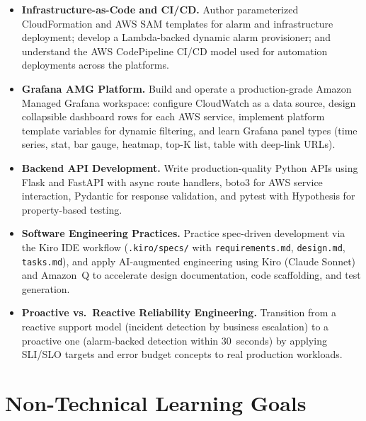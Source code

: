 \begin{itemize}
    \item \textbf{Infrastructure-as-Code and CI/CD.}
          Author parameterized CloudFormation and AWS SAM templates for
          alarm and infrastructure deployment; develop a Lambda-backed
          dynamic alarm provisioner; and understand the AWS CodePipeline
          CI/CD model used for automation deployments across the platforms.

    \item \textbf{Grafana AMG Platform.}
          Build and operate a production-grade Amazon Managed Grafana
          workspace: configure CloudWatch as a data source, design
          collapsible dashboard rows for each AWS service, implement
          platform template variables for dynamic filtering, and learn
          Grafana panel types (time series, stat, bar gauge, heatmap,
          top-K list, table with deep-link URLs).

    \item \textbf{Backend API Development.}
          Write production-quality Python APIs using Flask and
          FastAPI with async route handlers, boto3 for
          AWS service interaction, Pydantic for response validation, and
          pytest with Hypothesis for property-based testing.

    \item \textbf{Software Engineering Practices.}
          Practice spec-driven development via the Kiro IDE workflow
          (\texttt{.kiro/specs/} with \texttt{requirements.md},
          \texttt{design.md}, \texttt{tasks.md}), and apply AI-augmented
          engineering using Kiro (Claude Sonnet) and Amazon~Q to
          accelerate design documentation, code scaffolding, and test
          generation.

    \item \textbf{Proactive vs.\ Reactive Reliability Engineering.}
          Transition from a reactive support model (incident detection by
          business escalation) to a proactive one (alarm-backed detection
          within 30~seconds) by applying SLI/SLO targets and error budget
          concepts to real production workloads.

\end{itemize}


\FloatBarrier

\section{Non-Technical Learning Goals}


